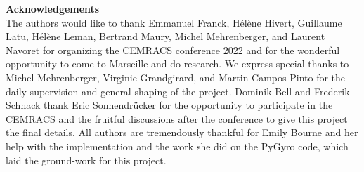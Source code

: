 \documentclass[proc]{edpsmath}
\begin{document}
\maketitle

\newpage











\begin{acknowledgement}
	\textbf{Acknowledgements}\\
	The authors would like to thank Emmanuel Franck, Hélène Hivert, Guillaume Latu, Hélène Leman, Bertrand Maury, Michel Mehrenberger, and Laurent Navoret for organizing the CEMRACS conference 2022 and for the wonderful opportunity to come to Marseille and do research. We express special thanks to Michel Mehrenberger, Virginie Grandgirard, and Martin Campos Pinto for the daily supervision and general shaping of the project. Dominik Bell and Frederik Schnack thank Eric Sonnendrücker for the opportunity to participate in the CEMRACS and the fruitful discussions after the conference to give this project the final details. All authors are tremendously thankful for Emily Bourne and her help with the implementation and the work she did on the PyGyro code, which laid the ground-work for this project.
\end{acknowledgement}



\end{document}
